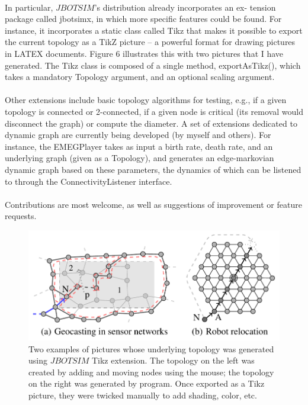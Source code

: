\paragraph{}In particular,  $JBOTSIM$’s distribution already incorporates an ex- tension package called jbotsimx, in which more specific features could be found. For instance, it incorporates a static class called Tikz that makes it possible to export the current topology as a TikZ picture – a powerful format for drawing pictures in LATEX documents. Figure 6 illustrates this with two pictures that I have generated. The Tikz class is composed of a single method, exportAsTikz(), which takes a mandatory Topology argument, and an optional scaling argument.
\paragraph{}Other extensions include basic topology algorithms for testing, e.g., if a given topology is connected or 2-connected, if a given node is critical (its removal would disconnect the graph) or compute the diameter. A set of extensions dedicated to dynamic graph are currently being developed (by myself and others). For instance, the EMEGPlayer takes as input a birth rate, death rate, and an underlying graph (given as a Topology), and generates an edge-markovian dynamic graph based on these parameters, the dynamics of which can be listened to through the ConnectivityListener interface.
\paragraph{}Contributions are most welcome, as well as suggestions of improvement or feature requests.

\begin{figure}[h]
	\centering
	\includegraphics[width=0.7\linewidth]{fig_7}
	\caption[Two examples of pictures whose underlying topology was generated using $JBOTSIM$ Tikz extension. The topology on the left was created by adding and moving nodes using the mouse; the topology on the right was generated by program. Once exported as a Tikz picture, they were twicked manually to add shading, color, etc.]{Two examples of pictures whose underlying topology was generated using $JBOTSIM$ Tikz extension. The topology on the left was created by adding and moving nodes using the mouse; the topology on the right was generated by program. Once exported as a Tikz picture, they were twicked manually to add shading, color, etc.}
	\label{fig:fig7}
\end{figure}


